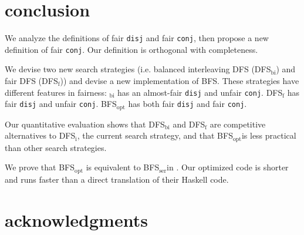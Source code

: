 \documentclass[format=acmlarge, review=true, authordraft=true]{acmart}
\newcommand{\conj}{\texttt{conj}}
\newcommand{\disj}{\texttt{disj}}
\newcommand{\BFSopt}[0]{BFS$_\textrm{opt}$}
\newcommand{\BFSser}[0]{BFS$_\textrm{ser}$}
\begin{document}
\section{conclusion}

We analyze the definitions of fair \disj{} and fair \conj{}, then propose a 
new definition of fair \conj{}. Our definition is orthogonal with completeness.

We devise two new search strategies (i.e. balanced interleaving DFS 
(DFS$_\textrm{bi}$) and fair DFS (DFS$_\textrm{f}$)) and devise a new 
implementation of BFS. These strategies have different features 
in fairness: $_\textrm{bi}$ has an almost-fair \disj{} and unfair \conj{}. 
DFS$_\textrm{f}$ has fair \disj{} and unfair \conj{}. \BFSopt{} has both fair
\disj{} and fair \conj{}.

Our quantitative evaluation shows that DFS$_\textrm{bi}$ and DFS$_\textrm{f}$ are competitive 
alternatives to DFS$_\textrm{i}$, the current search strategy, and that 
\BFSopt is less practical than other search strategies.

We prove that \BFSopt{} is equivalent to \BFSser in \citet{seres1999algebra}. 
Our optimized code is shorter and runs faster than a direct translation 
of their Haskell code.

\section*{acknowledgments}



\end{document}
